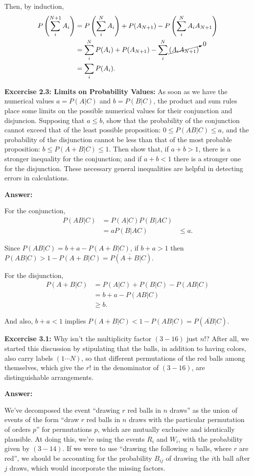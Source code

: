 \documentclass{article}
\begin{document}
Then, by induction,
\begin{align}
	P\left(\sum_i^{N+1}A_i\right)&=P\left(\sum_i^NA_i\right)+P(A_{N+1})-P\left(\sum_i^NA_iA_{N+1}\right)\\
	&=\sum_i^NP(A_i)+P(A_{N+1})-\sum_i^N\cancelto0{(A_iA_{N+1})}\\
	&=\sum_iP(A_i).
\end{align}

\textbf{Excercise 2.3: Limits on Probability Values: } As soon as we have the numerical values $a=P(A|C)$ and $b=P(B|C)$, the product and sum rules place some limits on the possible numerical values for their conjunction and disjuncion. Supposing that $a\leq b$, show that the probability of the conjunction cannot exceed that of the least possible proposition: $0\leq P(AB|C)\leq a$, and the probability of the disjunction cannot be less than that of the most probable proposition: $b\leq P(A+B|C)\leq 1$. Then show that, if $a+b>1$, there is a stronger inequality for the conjunction; and if $a+b<1$ there is a stronger one for the disjunction. These necessary general inequalities are helpful in detecting errors in calculations.

\textbf{Answer: }

For the conjunction,
\begin{align}
	P(AB|C)&=P(A|C)P(B|AC)\\
	&=aP(B|AC)
	&\leq a.
\end{align}

Since $P(AB|C)=b+a-P(A+B|C)$, if $b+a>1$ then $P(AB|C)>1-P(A+B|C)=P(\overline{A+B}|C)$.

For the disjunction,
\begin{align}
	P(A+B|C)&=P(A|C)+P(B|C)-P(AB|C)\\
	&=b+a-P(AB|C)\\
	&\geq b.
\end{align}

And also, $b+a<1$ implies $P(A+B|C)<1-P(AB|C)=P(\overline{AB}|C)$.

\textbf{Excercise 3.1: }Why isn't the multiplicity factor $(3-16)$ just $n!$? After all, we started this discussion by stipulating that the balls, in addition to having colors, also carry labels $(1\cdots N)$, so that different permutations of the red balls among themselves, which give the $r!$ in the denominator of $(3-16)$, are distinguishable arrangements.

\textbf{Answer: }

We've decomposed the event ``drawing $r$ red balls in $n$ draws'' as the union of events of the form ``draw $r$ red balls in $n$ draws with the particular permutation of orders $p$'' for permutations $p$, which are mutually exclusive and identically plausible. At doing this, we're using the events $R_i$ and $W_i$, with the probability given by $(3-14)$. If we were to use ``drawing the following $n$ balls, where $r$ are red'', we should be accounting for the probability $B_{ij}$ of drawing the $i$th ball after $j$ draws, which would incorporate the missing factors.
\end{document}
